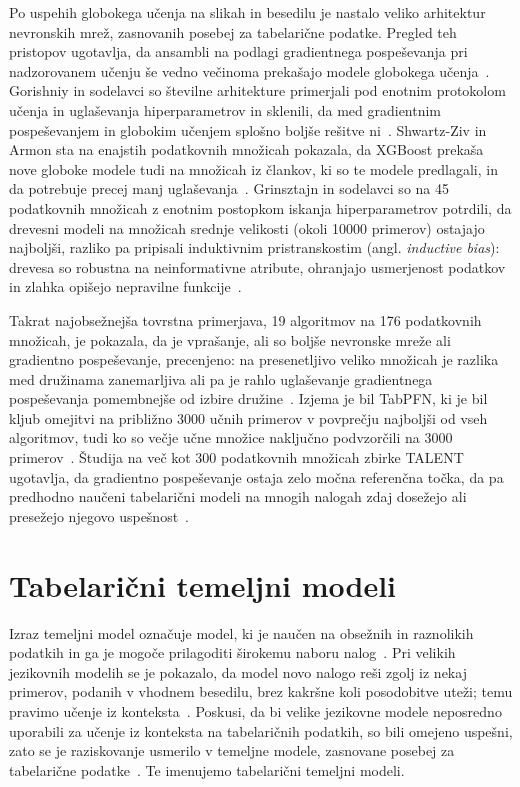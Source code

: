 \documentclass[a4paper,12pt,openright]{book}
\begin{document}
Po uspehih globokega učenja na slikah in
besedilu je nastalo veliko arhitektur nevronskih mrež, zasnovanih posebej za
tabelarične podatke. Pregled teh pristopov ugotavlja, da ansambli na podlagi
gradientnega pospeševanja pri nadzorovanem
učenju še vedno večinoma prekašajo modele globokega
učenja~\cite{borisov2024deep}. Gorishniy in sodelavci so številne arhitekture
primerjali pod enotnim protokolom učenja in uglaševanja hiperparametrov in
sklenili, da med gradientnim
pospeševanjem in globokim učenjem splošno boljše rešitve
ni~\cite{gorishniy2021revisiting}. Shwartz-Ziv in Armon sta na enajstih
podatkovnih množicah pokazala, da XGBoost prekaša nove globoke modele tudi na
množicah iz člankov, ki so te modele predlagali, in da potrebuje precej manj
uglaševanja~\cite{shwartzziv2022tabular}. Grinsztajn in sodelavci so na 45
podatkovnih množicah z enotnim postopkom iskanja hiperparametrov potrdili, da
drevesni modeli na množicah srednje velikosti (okoli \num{10000} primerov)
ostajajo najboljši, razliko pa pripisali induktivnim pristranskostim (angl.
\emph{inductive bias}): drevesa so robustna na neinformativne atribute,
ohranjajo usmerjenost podatkov in zlahka opišejo nepravilne
funkcije~\cite{grinsztajn2022why}.

Takrat najobsežnejša tovrstna primerjava, 19 algoritmov na 176 podatkovnih množicah,
je pokazala, da je vprašanje, ali so boljše nevronske mreže ali gradientno
pospeševanje, precenjeno: na presenetljivo veliko množicah je razlika med
družinama zanemarljiva ali pa je rahlo uglaševanje gradientnega pospeševanja
pomembnejše od izbire družine~\cite{mcelfresh2023neural}. Izjema je bil
TabPFN, ki je bil kljub omejitvi na približno 3000 učnih primerov v povprečju
najboljši od vseh algoritmov, tudi ko so večje učne množice naključno
podvzorčili na 3000 primerov~\cite{mcelfresh2023neural}. Študija na več kot
300 podatkovnih množicah zbirke TALENT ugotavlja, da gradientno pospeševanje
ostaja zelo močna referenčna točka, da pa predhodno naučeni tabelarični modeli
na mnogih nalogah zdaj dosežejo ali presežejo njegovo
uspešnost~\cite{ye2024closer}.

\section{Tabelarični temeljni modeli}
\label{sec:sor-temeljni}

Izraz temeljni model označuje model, ki je
naučen na obsežnih in raznolikih podatkih in ga je mogoče prilagoditi
širokemu naboru nalog~\cite{bommasani2021opportunities}. Pri velikih jezikovnih
modelih se je pokazalo, da model novo nalogo reši zgolj iz nekaj primerov,
podanih v vhodnem besedilu, brez kakršne koli posodobitve uteži; temu pravimo
učenje iz konteksta~\cite{brown2020language}.
Poskusi, da bi velike jezikovne modele neposredno uporabili za učenje iz
konteksta na tabelaričnih podatkih, so bili omejeno uspešni, zato se je
raziskovanje usmerilo v temeljne modele, zasnovane posebej za tabelarične
podatke~\cite{ma2025tabdpt}. Te imenujemo tabelarični temeljni modeli.
\end{document}
